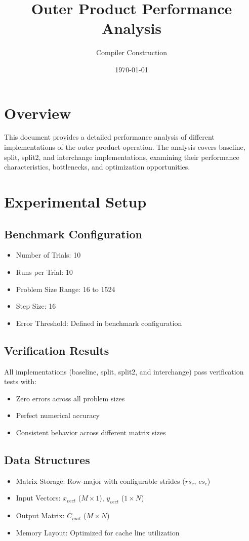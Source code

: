 \documentclass[11pt,a4paper]{article}
\title{Outer Product Performance Analysis}
\author{Compiler Construction}
\date{\today}
\begin{document}
\maketitle

\section{Overview}
This document provides a detailed performance analysis of different implementations of the outer product operation. The analysis covers baseline, split, split2, and interchange implementations, examining their performance characteristics, bottlenecks, and optimization opportunities.

\section{Experimental Setup}
\subsection{Benchmark Configuration}
\begin{itemize}
    \item Number of Trials: 10
    \item Runs per Trial: 10
    \item Problem Size Range: 16 to 1524
    \item Step Size: 16
    \item Error Threshold: Defined in benchmark configuration
\end{itemize}

\subsection{Verification Results}
All implementations (baseline, split, split2, and interchange) pass verification tests with:
\begin{itemize}
    \item Zero errors across all problem sizes
    \item Perfect numerical accuracy
    \item Consistent behavior across different matrix sizes
\end{itemize}

\subsection{Data Structures}
\begin{itemize}
    \item Matrix Storage: Row-major with configurable strides ($rs_c$, $cs_c$)
    \item Input Vectors: $x_{vect}$ ($M \times 1$), $y_{vect}$ ($1 \times N$)
    \item Output Matrix: $C_{mat}$ ($M \times N$)
    \item Memory Layout: Optimized for cache line utilization
\end{itemize}
\end{document}
